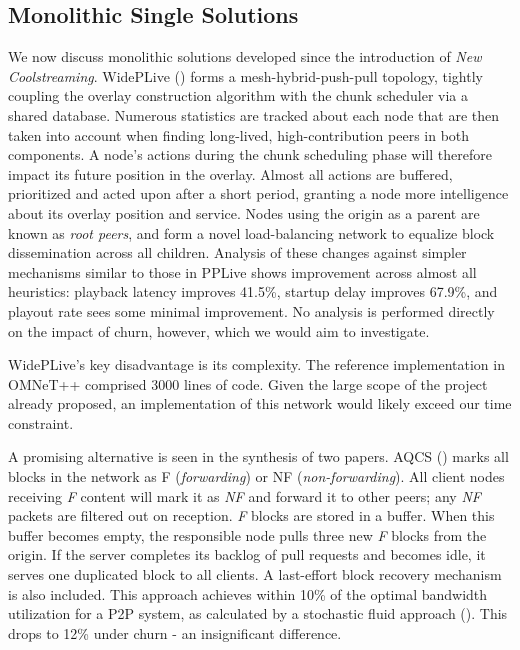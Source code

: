 \documentclass[12pt,a4paper]{article}
\begin{document}
\subsection{Monolithic Single Solutions} \label{litreview:monoliths}
We now discuss monolithic solutions developed since the introduction of \textit{New Coolstreaming}. WidePLive (\cite{Sina2020}) forms a mesh-hybrid-push-pull topology, tightly coupling the overlay construction algorithm with the chunk scheduler via a shared database. Numerous statistics are tracked about each node that are then taken into account when finding long-lived, high-contribution peers in both components. A node's actions during the chunk scheduling phase will therefore impact its future position in the overlay. Almost all actions are buffered, prioritized and acted upon after a short period, granting a node more intelligence about its overlay position and service. Nodes using the origin as a parent are known as \textit{root peers}, and form a novel load-balancing network to equalize block dissemination across all children. Analysis of these changes against simpler mechanisms similar to those in PPLive shows improvement across almost all heuristics: playback latency improves 41.5\%, startup delay improves 67.9\%, and playout rate sees some minimal improvement. No analysis is performed directly on the impact of churn, however, which we would aim to investigate.

WidePLive's key disadvantage is its complexity. The reference implementation in OMNeT++ comprised 3000 lines of code. Given the large scope of the project already proposed, an implementation of this network would likely exceed our time constraint.

A promising alternative is seen in the synthesis of two papers. AQCS (\cite{Guo2008}) marks all blocks in the network as F (\textit{forwarding}) or NF (\textit{non-forwarding}). All client nodes receiving \textit{F} content will mark it as \textit{NF} and forward it to other peers; any \textit{NF} packets are filtered out on reception. \textit{F} blocks are stored in a buffer. When this buffer becomes empty, the responsible node pulls three new \textit{F} blocks from the origin. If the server completes its backlog of pull requests and becomes idle, it serves one duplicated block to all clients. A last-effort block recovery mechanism is also included. This approach achieves within 10\% of the optimal bandwidth utilization for a P2P system, as calculated by a stochastic fluid approach (\cite{Kumar2007}). This drops to 12\% under churn - an insignificant difference.
\end{document}

